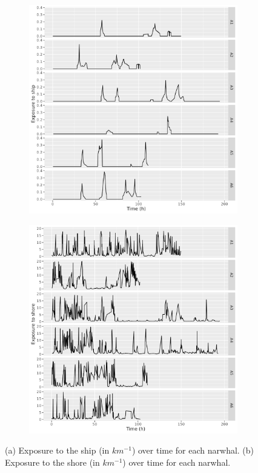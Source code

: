 \documentclass[11pt]{article}
\newcommand {\1}{\mathbb{1}}
\theoremstyle{definition}
\theoremstyle{remark}
\theoremstyle{remark}
\begin{document}
\begin{figure}[H]
	\centering
	\begin{subfigure}{0.48\textwidth}
		\centering
		\includegraphics[scale=0.42]{images/data_exploration/realExpShip_through_time.png}
		\caption{}
	\end{subfigure}
	\begin{subfigure}{0.48\textwidth}
		\centering
		\includegraphics[scale=0.42]{images/data_exploration/realExpShore_through_time.png}
		\caption{}
	\end{subfigure}
	\caption{(a) Exposure to the ship (in $km^{-1}$) over time for each narwhal. (b) Exposure to the shore (in $km^{-1}$) over time for each narwhal.}  
	\label{fig: realexpthroughtime}
\end{figure}
\end{document}
